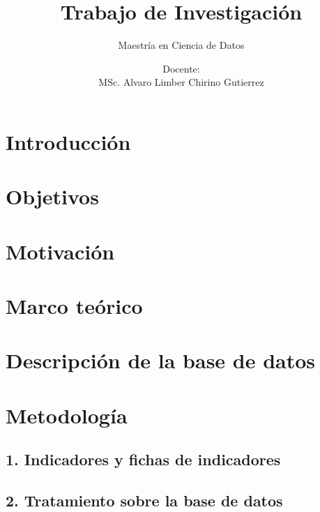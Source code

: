 \documentclass[
]{article}
\title{Trabajo de Investigación}
\subtitle{Maestría en Ciencia de Datos}
\author{Docente:\\
MSc. Alvaro Limber Chirino Gutierrez}
\date{Maestrantes:\\
- Ada Milenka Cuento Callisaya\\
- Alexander Ernesto Sucre Casas\\
\strut \\
Noviembre, 2023}
\begin{document}
\maketitle

{
\setcounter{tocdepth}{3}
\tableofcontents
}
\pagebreak

\hypertarget{introducciuxf3n}{%
\section{Introducción}\label{introducciuxf3n}}

\hypertarget{objetivos}{%
\section{Objetivos}\label{objetivos}}

\hypertarget{motivaciuxf3n}{%
\section{Motivación}\label{motivaciuxf3n}}

\hypertarget{marco-teuxf3rico}{%
\section{Marco teórico}\label{marco-teuxf3rico}}

\hypertarget{descripciuxf3n-de-la-base-de-datos}{%
\section{Descripción de la base de
datos}\label{descripciuxf3n-de-la-base-de-datos}}

\hypertarget{metodologuxeda}{%
\section{Metodología}\label{metodologuxeda}}

\hypertarget{indicadores-y-fichas-de-indicadores}{%
\subsection{1. Indicadores y fichas de
indicadores}\label{indicadores-y-fichas-de-indicadores}}

\hypertarget{tratamiento-sobre-la-base-de-datos}{%
\subsection{2. Tratamiento sobre la base de
datos}\label{tratamiento-sobre-la-base-de-datos}}
\end{document}
